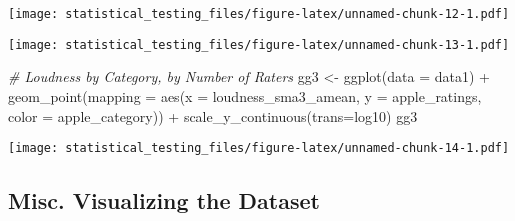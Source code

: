\documentclass[
]{article}
\newenvironment{Shaded}{\begin{snugshade}}{\end{snugshade}}
\newcommand{\AttributeTok}[1]{\textcolor[rgb]{0.77,0.63,0.00}{#1}}
\newcommand{\CommentTok}[1]{\textcolor[rgb]{0.56,0.35,0.01}{\textit{#1}}}
\newcommand{\FunctionTok}[1]{\textcolor[rgb]{0.00,0.00,0.00}{#1}}
\newcommand{\NormalTok}[1]{#1}
\newcommand{\OtherTok}[1]{\textcolor[rgb]{0.56,0.35,0.01}{#1}}
\newcommand{\SpecialCharTok}[1]{\textcolor[rgb]{0.00,0.00,0.00}{#1}}
\newcommand{\StringTok}[1]{\textcolor[rgb]{0.31,0.60,0.02}{#1}}
\begin{document}
\texttt{[image: statistical\_testing\_files/figure-latex/unnamed-chunk-12-1.pdf]}

\begin{Shaded}
\end{Shaded}

\texttt{[image: statistical\_testing\_files/figure-latex/unnamed-chunk-13-1.pdf]}

\begin{Shaded}
\begin{Highlighting}[]
\CommentTok{\# Loudness by Category, by Number of Raters}
\NormalTok{gg3 }\OtherTok{\textless{}{-}} \FunctionTok{ggplot}\NormalTok{(}\AttributeTok{data =}\NormalTok{ data1) }\SpecialCharTok{+}
  \FunctionTok{geom\_point}\NormalTok{(}\AttributeTok{mapping =} \FunctionTok{aes}\NormalTok{(}\AttributeTok{x =}\NormalTok{ loudness\_sma3\_amean, }\AttributeTok{y =}\NormalTok{ apple\_ratings, }\AttributeTok{color =}\NormalTok{ apple\_category)) }\SpecialCharTok{+}
  \FunctionTok{scale\_y\_continuous}\NormalTok{(}\AttributeTok{trans=}\StringTok{\textquotesingle{}log10\textquotesingle{}}\NormalTok{)}
\NormalTok{gg3}
\end{Highlighting}
\end{Shaded}

\texttt{[image: statistical\_testing\_files/figure-latex/unnamed-chunk-14-1.pdf]}

\hypertarget{misc.-visualizing-the-dataset}{%
\subsection{Misc. Visualizing the
Dataset}\label{misc.-visualizing-the-dataset}}
\end{document}
